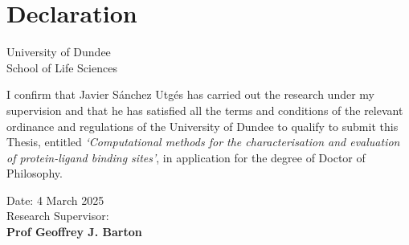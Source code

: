 \chapter*{Declaration} %

\begin{center}
    \LARGE University of Dundee\\[1cm]
    \LARGE School of Life Sciences\\[2cm]
\end{center}

I confirm that Javier Sánchez Utgés has carried out the research under my supervision and that he has satisfied all the terms and conditions of the relevant ordinance and regulations of the University of Dundee to qualify to submit this Thesis, entitled \textit{`Computational methods for the characterisation and evaluation of protein-ligand binding sites'}, in application for the degree of Doctor of Philosophy.

\vfill

\begin{flushright}
    Date: 4 March 2025\\[1.5cm]
    Research Supervisor: \underline{\hspace{6cm}}\\[1cm]
    \textbf{Prof Geoffrey J. Barton}
\end{flushright}